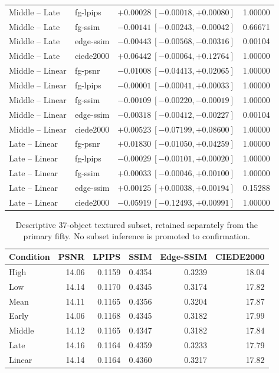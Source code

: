 \documentclass[11pt]{article}
\begin{document}
\begin{longtable}{llrr}
Middle -- Late & fg-lpips & $+0.00028\ [-0.00018,+0.00080]$ & 1.00000 \\
Middle -- Late & fg-ssim & $-0.00141\ [-0.00243,-0.00042]$ & 0.66671 \\
Middle -- Late & edge-ssim & $-0.00443\ [-0.00568,-0.00316]$ & 0.00104 \\
Middle -- Late & ciede2000 & $+0.06442\ [-0.00064,+0.12764]$ & 1.00000 \\
Middle -- Linear & fg-psnr & $-0.01008\ [-0.04413,+0.02065]$ & 1.00000 \\
Middle -- Linear & fg-lpips & $-0.00001\ [-0.00041,+0.00033]$ & 1.00000 \\
Middle -- Linear & fg-ssim & $-0.00109\ [-0.00220,-0.00019]$ & 1.00000 \\
Middle -- Linear & edge-ssim & $-0.00318\ [-0.00412,-0.00227]$ & 0.00104 \\
Middle -- Linear & ciede2000 & $+0.00523\ [-0.07199,+0.08600]$ & 1.00000 \\
Late -- Linear & fg-psnr & $+0.01830\ [-0.01050,+0.04259]$ & 1.00000 \\
Late -- Linear & fg-lpips & $-0.00029\ [-0.00101,+0.00020]$ & 1.00000 \\
Late -- Linear & fg-ssim & $+0.00033\ [-0.00046,+0.00100]$ & 1.00000 \\
Late -- Linear & edge-ssim & $+0.00125\ [+0.00038,+0.00194]$ & 0.15288 \\
Late -- Linear & ciede2000 & $-0.05919\ [-0.12493,+0.00991]$ & 1.00000 \\
\bottomrule\end{longtable}\endgroup
\begin{table}[ht]\centering\scriptsize
\caption{Descriptive 37-object textured subset, retained separately from the primary fifty. No subset inference is promoted to confirmation.}
\begin{tabular}{lrrrrr}\toprule Condition & PSNR & LPIPS & SSIM & Edge-SSIM & CIEDE2000 \\
\midrule
High & 14.06 & 0.1159 & 0.4354 & 0.3239 & 18.04 \\
Low & 14.14 & 0.1170 & 0.4345 & 0.3174 & 17.82 \\
Mean & 14.11 & 0.1165 & 0.4356 & 0.3204 & 17.87 \\
Early & 14.06 & 0.1168 & 0.4345 & 0.3182 & 17.99 \\
Middle & 14.12 & 0.1165 & 0.4347 & 0.3182 & 17.84 \\
Late & 14.16 & 0.1164 & 0.4359 & 0.3233 & 17.79 \\
Linear & 14.14 & 0.1164 & 0.4360 & 0.3217 & 17.82 \\
\bottomrule\end{tabular}\end{table}
\end{document}
